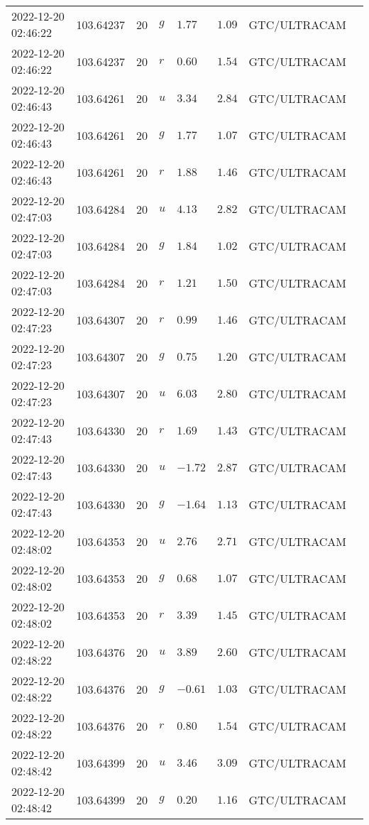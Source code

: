 \documentclass{nature_plusfigure}
\begin{document}
\begin{supplement}
\begin{center}
\begin{longtable}{llllllll}
2022-12-20 02:46:22 & 103.64237 & 20 & $g$ & $1.77$ & $1.09$ & GTC/ULTRACAM &  \\ 
2022-12-20 02:46:22 & 103.64237 & 20 & $r$ & $0.60$ & $1.54$ & GTC/ULTRACAM &  \\ 
2022-12-20 02:46:43 & 103.64261 & 20 & $u$ & $3.34$ & $2.84$ & GTC/ULTRACAM &  \\ 
2022-12-20 02:46:43 & 103.64261 & 20 & $g$ & $1.77$ & $1.07$ & GTC/ULTRACAM &  \\ 
2022-12-20 02:46:43 & 103.64261 & 20 & $r$ & $1.88$ & $1.46$ & GTC/ULTRACAM &  \\ 
2022-12-20 02:47:03 & 103.64284 & 20 & $u$ & $4.13$ & $2.82$ & GTC/ULTRACAM &  \\ 
2022-12-20 02:47:03 & 103.64284 & 20 & $g$ & $1.84$ & $1.02$ & GTC/ULTRACAM &  \\ 
2022-12-20 02:47:03 & 103.64284 & 20 & $r$ & $1.21$ & $1.50$ & GTC/ULTRACAM &  \\ 
2022-12-20 02:47:23 & 103.64307 & 20 & $r$ & $0.99$ & $1.46$ & GTC/ULTRACAM &  \\ 
2022-12-20 02:47:23 & 103.64307 & 20 & $g$ & $0.75$ & $1.20$ & GTC/ULTRACAM &  \\ 
2022-12-20 02:47:23 & 103.64307 & 20 & $u$ & $6.03$ & $2.80$ & GTC/ULTRACAM &  \\ 
2022-12-20 02:47:43 & 103.64330 & 20 & $r$ & $1.69$ & $1.43$ & GTC/ULTRACAM &  \\ 
2022-12-20 02:47:43 & 103.64330 & 20 & $u$ & $-1.72$ & $2.87$ & GTC/ULTRACAM &  \\ 
2022-12-20 02:47:43 & 103.64330 & 20 & $g$ & $-1.64$ & $1.13$ & GTC/ULTRACAM &  \\ 
2022-12-20 02:48:02 & 103.64353 & 20 & $u$ & $2.76$ & $2.71$ & GTC/ULTRACAM &  \\ 
2022-12-20 02:48:02 & 103.64353 & 20 & $g$ & $0.68$ & $1.07$ & GTC/ULTRACAM &  \\ 
2022-12-20 02:48:02 & 103.64353 & 20 & $r$ & $3.39$ & $1.45$ & GTC/ULTRACAM &  \\ 
2022-12-20 02:48:22 & 103.64376 & 20 & $u$ & $3.89$ & $2.60$ & GTC/ULTRACAM &  \\ 
2022-12-20 02:48:22 & 103.64376 & 20 & $g$ & $-0.61$ & $1.03$ & GTC/ULTRACAM &  \\ 
2022-12-20 02:48:22 & 103.64376 & 20 & $r$ & $0.80$ & $1.54$ & GTC/ULTRACAM &  \\ 
2022-12-20 02:48:42 & 103.64399 & 20 & $u$ & $3.46$ & $3.09$ & GTC/ULTRACAM &  \\ 
2022-12-20 02:48:42 & 103.64399 & 20 & $g$ & $0.20$ & $1.16$ & GTC/ULTRACAM &  \\ 

\end{longtable}
\end{center}
\end{supplement}
\end{document}
